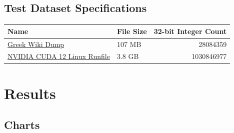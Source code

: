 \documentclass[11pt]{article}
\begin{document}
\subsection{Test Dataset Specifications}
\label{sec:org97ea941}
\begin{center}
\begin{tabular}{llr}
\hline
Name & File Size & 32-bit Integer Count\\[0pt]
\hline
\href{https://dumps.wikimedia.org/other/static\_html\_dumps/current/el/wikipedia-el-html.tar.7z}{Greek Wiki Dump} & 107 MB & 28084359\\[0pt]
\href{https://developer.download.nvidia.com/compute/cuda/12.0.0/local\_installers/cuda\_12.0.0\_525.60.13\_linux.run}{NVIDIA CUDA 12 Linux Runfile} & 3.8 GB & 1030846977\\[0pt]
\hline
\end{tabular}
\end{center}
\pagebreak
\section{Results}
\label{sec:org8819300}
\subsection{Charts}
\label{sec:org646e005}
\end{document}
